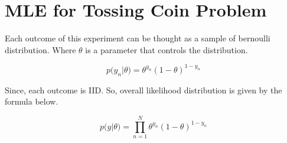 \section{MLE for Tossing Coin Problem}

Each outcome of this experiment can be thought as a sample of bernoulli distribution. Where $\theta$ is a parameter that controls the distribution.

\begin{equation}
        p\big(y_n | \theta\big) = \theta ^ {y_n} (1 - \theta)^{1 - y_n}
\end{equation}

Since, each outcome is IID. So, overall likelihood distribution is given by the formula below.

\begin{equation*}
        p\big(y | \theta\big) = \prod_{n=1}^{N} \theta ^ {y_n} (1 - \theta)^{1 - y_n}
\end{equation*}

